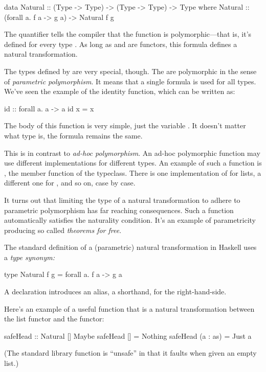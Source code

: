 \documentclass[DaoFP]{subfiles}
\begin{document}
\begin{haskell}
data Natural :: (Type -> Type) -> (Type -> Type) -> Type where
  Natural :: (forall a. f a -> g a) -> Natural f g
\end{haskell}
The  quantifier tells the compiler that the function is polymorphic---that is, it's defined for every type . As long as  and  are functors, this formula defines a natural transformation. 

The types defined by  are very special, though. The are polymorphic in the sense of \emph{parametric polymorphism}. It means that a single formula is used for all types. We've seen the example of the identity function, which can be written as:
\begin{haskell}
id :: forall a. a -> a
id x = x
\end{haskell}
The body of this function is very simple, just the variable . It doesn't matter what type  is, the formula remains the same.

This is in contrast to \emph{ad-hoc polymorphism}. An ad-hoc polymorphic function may use different implementations for different types. An example of such a function is , the member function of the  typeclass. There is one implementation of  for lists, a different one for , and so on, case by case. 

It turns out that limiting the type of a natural transformation to adhere to parametric polymorphism has far reaching consequences. Such a function automatically satisfies the naturality condition. It's an example of parametricity producing so called \emph{theorems for free}. 

The standard definition of a (parametric) natural transformation in Haskell uses a \emph{type synonym:}
\begin{haskell}
type Natural f g = forall a. f a -> g a
\end{haskell}
A  declaration introduces an alias, a shorthand, for the right-hand-side.

Here's an example of a useful function that is a natural transformation between the list functor and the  functor:
\begin{haskell}
safeHead :: Natural [] Maybe
safeHead [] = Nothing
safeHead (a : as) = Just a
\end{haskell}
(The standard library  function is ``unsafe'' in that it faults when given an empty list.)
\end{document}
